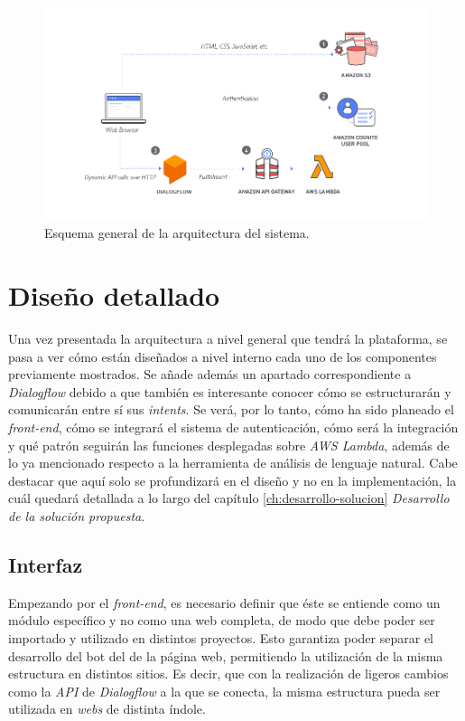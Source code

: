\documentclass[11pt,spanish,listoffigures]{tfgetsinf}
\begin{document}
\begin{figure}[h!]
    \centering
    \includegraphics[width=1\textwidth]{images/img06.png}
    \caption{ Esquema general de la arquitectura del sistema.}
\end{figure}



\section{Diseño detallado}
\label{sec:diseno-detallado}

Una vez presentada la arquitectura a nivel general que tendrá la plataforma, se pasa a ver cómo están diseñados a nivel interno cada uno de los componentes previamente mostrados. Se añade además un apartado correspondiente a \textit{Dialogflow} debido a que también es interesante conocer cómo se estructurarán y comunicarán entre sí sus \textit{intents}. Se verá, por lo tanto, cómo ha sido planeado el \textit{front-end}, cómo se integrará el sistema de autenticación, cómo será la integración y qué patrón seguirán las funciones desplegadas sobre \textit{AWS Lambda}, además de lo ya mencionado respecto a la herramienta de análisis de lenguaje natural. Cabe destacar que aquí solo se profundizará en el diseño y no en la implementación, la cuál quedará detallada a lo largo del capítulo  \ref{ch:desarrollo-solucion} \textit{Desarrollo de la solución propuesta}.

\subsection{Interfaz}
\label{subsec:design-interfaz}

Empezando por el \textit{front-end}, es necesario definir que éste se entiende como un módulo específico y no como una web completa, de modo que debe poder ser importado y utilizado en distintos proyectos. Esto garantiza poder separar el desarrollo del bot del de la página web, permitiendo la utilización de la misma estructura en distintos sitios. Es decir, que con la realización de ligeros cambios como la \textit{API} de \textit{Dialogflow} a la que se conecta, la misma estructura pueda ser utilizada en \textit{webs} de distinta índole. 
\end{document}

